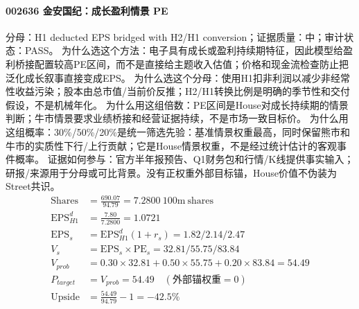 \paragraph{002636 金安国纪：成长盈利情景 PE}
分母：H1 deducted EPS bridged with H2/H1 conversion；证据质量：中；审计状态：PASS。
为什么选这个方法：电子具有成长或盈利持续期特征，因此模型给盈利桥接配置较高PE区间，而不是直接给主题收入估值；价格和现金流检查防止把泛化成长叙事直接变成EPS。
为什么选这个分母：使用H1扣非利润以减少非经常性收益污染；股本由总市值/当前价反推；H2/H1转换比例是明确的季节性和交付假设，不是机械年化。
为什么用这组倍数：PE区间是House对成长持续期的情景判断；牛市情景要求业绩桥接和经营证据持续，不是市场一致目标价。
为什么用这组概率：30\%/50\%/20\%是统一筛选先验：基准情景权重最高，同时保留熊市和牛市的实质性下行/上行贡献；它是House情景权重，不是经过统计估计的客观事件概率。
证据如何参与：官方半年报预告、Q1财务包和行情/K线提供事实输入；研报/来源用于分母或可比背景。没有正权重外部目标锚，House价值不伪装为Street共识。
\begin{align*}
\mathrm{Shares} &= \frac{690.07}{94.79}=7.2800\ \mathrm{100m\ shares}\\
\mathrm{EPS}_{H1}^d &= \frac{7.80}{7.2800}=1.0721\\
\mathrm{EPS}_s &= \mathrm{EPS}_{H1}^d(1+r_s)=1.82/2.14/2.47\\
V_s &= \mathrm{EPS}_s\times \mathrm{PE}_s=32.81/55.75/83.84\\
V_{prob} &= 0.30\times 32.81+0.50\times 55.75+0.20\times 83.84=54.49\\
P_{target} &= V_{prob}=54.49\quad(\text{外部锚权重}=0)\\
\mathrm{Upside} &= \frac{54.49}{94.79}-1=-42.5\%\\
\end{align*}


